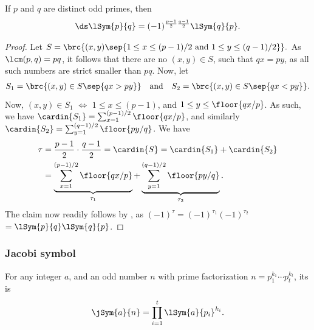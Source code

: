 \begin{theorem}
    If $p$ and $q$ are distinct odd primes, then 
    \begin{align*}
        \ds \lSym{p}{q} = (-1)^{\frac{p-1}{2} \frac{q-1}{2}}
        \lSym{q}{p}.
    \end{align*}
\end{theorem}
\begin{proof}
    Let 
    \begin{math}
        S = \brc{ (x,y) \sep{ 1\leq x \leq (p-1)/2 \text{ and }
              1 \leq y \leq (q-1)/2}}.
    \end{math}
    As $\lcm(p,q) = pq$, it follows that there are no $(x,y) \in S$,
    such that $qx = py$, as all such numbers are strict smaller than
    $pq$. Now, let
    \begin{align*}
        S_1= \brc{(x,y) \in S \sep{ qx >py}}%
        \quad\text{and}\quad %
        S_2= \brc{(x,y) \in S \sep{ qx <py}}.
    \end{align*}
    Now, $(x,y) \in S_1$ $\iff$ $1 \leq x \leq (p-1)$, and $1 \leq y
    \leq \floor{qx /p}$. As such, we have $\cardin{S_1} =
    \sum_{x=1}^{(p-1)/2} \floor{qx / p}$, and similarly $\cardin{S_2}
    = \sum_{y=1}^{(q-1)/2} \floor{py / q}$. We have
    \begin{align*}
        \tau%
        &= %
        \frac{p-1}{2} \cdot \frac{q-1}{2} = \cardin{S} = \cardin{S_1}
        + \cardin{S_2}\\
        &=%
        \underbrace{\sum_{x=1}^{(p-1)/2} \floor{qx / p}}_{\tau_1} +
        \underbrace{\sum_{y=1}^{(q-1)/2} \floor{py / q}}_{\tau_2}.
    \end{align*}
    The claim now readily follows by , as
    $(-1)^\tau = (-1)^{\tau_1} (-1)^{\tau_2}$ $= \lSym{p}{q}
    \lSym{q}{p}$.
\end{proof}

\subsubsection{Jacobi symbol}


\begin{defn}
    For any integer $a$, and an odd number $n$ with prime
    factorization $n=p_1^{k_1} \cdots p_t^{k_t}$, its  is
    \begin{align*}
        \jSym{a}{n} = \prod_{i=1}^t \lSym{a}{p_i}^{k_i}.
    \end{align*}
\end{defn}


